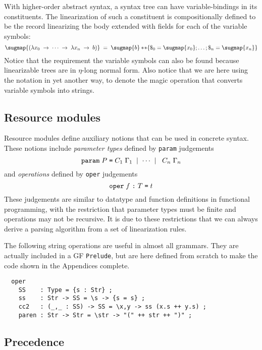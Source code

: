 \documentclass[12pt]{article}
\newcommand{\HOAS}{higher-order abstract syntax}
\newcommand{\empha}[1]{{\em #1}}
\newcommand{\rarrow}{\; \rightarrow\;}
\begin{document}
With \HOAS, a syntax tree can have variable-bindings in its
constituents. The linearization of such a constituent
is compositionally defined to be the record linearizing the body
extended with fields for each of the variable symbols:
\[
\sugmap{(\lambda x_{0} \rarrow \cdots \rarrow \lambda x_{n} \rarrow b)}
\;=\;
\sugmap{b} *\!* \{\$_{0} = \sugmap{x_{0}} ; \ldots ; \$_{n} = \sugmap{x_{n}}\}
\]
Notice that the requirement the variable symbols can
also be found because linearizable trees are in $\eta$-long normal form.
Also notice that we are here using the 
\sugmap{} notation in yet another way, to denote the magic operation
that converts variable symbols into strings.


\subsection{Resource modules}

Resource modules define auxiliary notions that can be
used in concrete syntax. These notions include
\empha{parameter types} defined by \texttt{param}
judgements
\[
\mbox{\texttt{param}} \; P \; \mbox{\texttt{=}} 
  \; C_{1} \; \Gamma_{1} \; \mid \; \cdots \; \mid \; 
  \; C_{n} \; \Gamma_{n}
\]
and \empha{operations} defined by
\texttt{oper} judgements
\[
\mbox{\texttt{oper}} \; f \; \mbox{\texttt{:}} \; T \; \mbox{\texttt{=}} \; t
\]
These judgements are
similar to datatype and function definitions
in functional programming, with the restriction
that parameter types must be finite and operations
may not be recursive. It is due to these restrictions that
we can always derive a parsing algorithm from a set of
linearization rules.

The following string operations are useful in almost
all grammars. They are actually included in a GF \texttt{Prelude},
but are here defined from scratch to make the code shown in
the Appendices complete.
\begin{verbatim}
  oper
    SS    : Type = {s : Str} ;
    ss    : Str -> SS = \s -> {s = s} ;
    cc2   : (_,_ : SS) -> SS = \x,y -> ss (x.s ++ y.s) ;
    paren : Str -> Str = \str -> "(" ++ str ++ ")" ;
\end{verbatim}



\subsection{Precedence}
\end{document}
